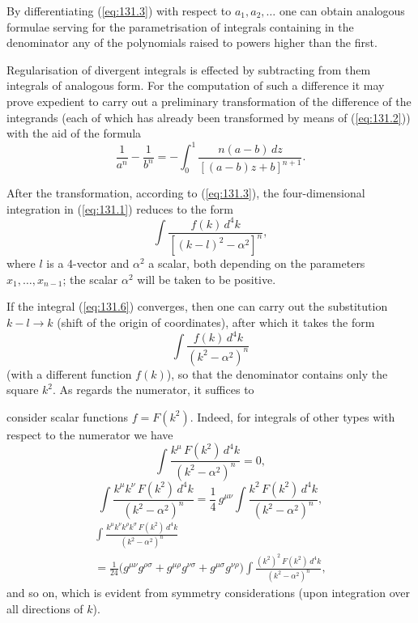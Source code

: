 By differentiating (\ref{eq:131.3}) with respect to $a_1, a_2, \ldots$ one can obtain analogous formulae serving for the parametrisation of integrals containing in the denominator any of the polynomials raised to powers higher than the first.

Regularisation of divergent integrals is effected by subtracting from them integrals of analogous form. For the computation of such a difference it may prove expedient to carry out a preliminary transformation of the difference of the integrands (each of which has already been transformed by means of (\ref{eq:131.2})) with the aid of the formula
\begin{equation}
\frac{1}{a^n} - \frac{1}{b^n} = -\int_0^1 \frac{n(a-b)\,dz}{[(a-b)z + b]^{n+1}}.
\label{eq:131.5}
\end{equation}

After the transformation, according to (\ref{eq:131.3}), the four-dimensional integration in (\ref{eq:131.1}) reduces to the form
\begin{equation}
\int \frac{f(k)\,d^4k}{[(k - l)^2 - \alpha^2]^n},
\label{eq:131.6}
\end{equation}
where $l$ is a 4-vector and $\alpha^2$ a scalar, both depending on the parameters $x_1, \ldots, x_{n-1}$; the scalar $\alpha^2$ will be taken to be positive.

If the integral (\ref{eq:131.6}) converges, then one can carry out the substitution $k - l \to k$ (shift of the origin of coordinates), after which it takes the form
\begin{equation}
\int \frac{f(k)\,d^4k}{(k^2 - \alpha^2)^n}
\label{eq:131.7}
\end{equation}
(with a different function $f(k)$), so that the denominator contains only the square $k^2$. As regards the numerator, it suffices to


\noindent consider scalar functions $f = F(k^2)$. Indeed, for integrals of other types with respect to the numerator we have
\begin{equation}
\int \frac{k^\mu\,F(k^2)\,d^4k}{(k^2 - \alpha^2)^n} = 0,
\label{eq:131.8}
\end{equation}
\begin{equation}
\int \frac{k^\mu k^\nu\,F(k^2)\,d^4k}{(k^2 - \alpha^2)^n} = \frac{1}{4}\,g^{\mu\nu}\int \frac{k^2\,F(k^2)\,d^4k}{(k^2 - \alpha^2)^n},
\label{eq:131.9}
\end{equation}
\begin{multline}
\int \frac{k^\mu k^\nu k^\rho k^\sigma\,F(k^2)\,d^4k}{(k^2 - \alpha^2)^n} \\
= \frac{1}{24}\bigl(g^{\mu\nu}g^{\rho\sigma} + g^{\mu\rho}g^{\nu\sigma} + g^{\mu\sigma}g^{\nu\rho}\bigr)\int \frac{(k^2)^2\,F(k^2)\,d^4k}{(k^2 - \alpha^2)^n},
\label{eq:131.10}
\end{multline}
and so on, which is evident from symmetry considerations (upon integration over all directions of $k$).

